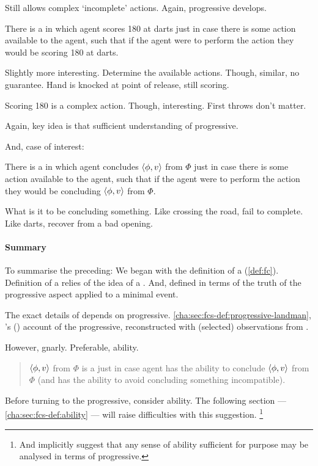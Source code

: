 \begin{note}
  Still allows complex `incomplete' actions.
  Again, progressive develops.

  \begin{illustration}[Darts]
    There is a \pevent{} in which agent scores 180 at darts just in case there is some action available to the agent, such that if the agent were to perform the action they would be scoring 180 at darts.
  \end{illustration}

  Slightly more interesting.
  Determine the available actions.
  Though, similar, no guarantee.
  Hand is knocked at point of release, still scoring.

  Scoring 180 is a complex action.
  Though, interesting.
  First throws don't matter.

  Again, key idea is that sufficient understanding of progressive.

  And, case of interest:

  \begin{illustration}[Concluding]
    There is a \pevent{} in which agent concludes \(\langle \phi, v \rangle\) from \(\Phi\) just in case there is some action available to the agent, such that if the agent were to perform the action they would be concluding \(\langle \phi, v \rangle\) from \(\Phi\).
  \end{illustration}

  What is it to be concluding something.
  Like crossing the road, fail to complete.
  Like darts, recover from a bad opening.
\end{note}


\paragraph{Summary}

\begin{note}[Summarising]
  To summarise the preceding:
  We began with the definition of a \fc{} (\autoref{def:fc}).
  Definition of a \fc{} relies of the idea of a \pevent{}.
  And, defined \pevent{} in terms of the truth of the progressive aspect applied to a minimal event.

  The exact details of \pevent{} depends on progressive.
  \autoref{cha:sec:fcs-def:progressive-landman}, \citeauthor{Landman:1992wh}'s (\citeyear{Landman:1992wh}) account of the progressive, reconstructed with (selected) observations from \textcite{Szabo:2004ul}.

  However, gnarly.
  Preferable, ability.
  \begin{quote}
    \(\langle \phi, v \rangle\) from \(\Phi\) is a \fc{} just in case agent has the ability to conclude \(\langle \phi, v \rangle\) from \(\Phi\) (and has the ability to avoid concluding something incompatible).
  \end{quote}
  Before turning to the progressive, consider ability.
  The following section --- \autoref{cha:sec:fcs-def:ability} --- will raise difficulties with this suggestion.%
  \footnote{
    And implicitly suggest that any sense of ability sufficient for purpose may be analysed in terms of progressive.
  }
\end{note}

